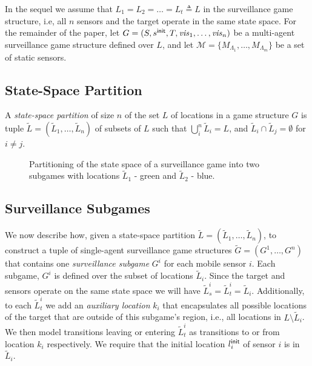 In the sequel we assume that $L_1 = L_2 = \dots = L_t \triangleq L$  in the surveillance game structure, i.e, all $n$ sensors and the target operate in the same state space. For the remainder of the paper, let $G=(S,s^{\mathsf{init}},T,\mathit{vis}_1,\ldots,\mathit{vis}_n)$ be a multi-agent surveillance game structure  defined over  $L$, and let $\mathcal M = \{M_{\Lambda_1},\dots,M_{\Lambda_m}\}$ be a set of static sensors.

\subsection{State-Space Partition}
A  \emph{state-space partition} of size $n$ of the set $L$ of locations in a game structure $G$ is tuple $\widetilde L =  (\widetilde L_1,\ldots,\widetilde L_n)$ of subsets of $L$ such that  $\bigcup_i^n \widetilde L_i = L $, and $\widetilde L_i \cap \widetilde L_j  = \emptyset$ for $i \neq j$. 


\begin{figure}
{}


\caption{Partitioning of the state space of a surveillance game into two subgames with locations $\widetilde{L}_1$ - green and $\widetilde{L}_2$ - blue. }
\label{fig:simple-dist-game}
\end{figure}

\subsection{Surveillance Subgames}
We now describe how, given a state-space partition $\widetilde L =  (\widetilde L_1,\ldots,\widetilde L_n)$, to construct a tuple of single-agent surveillance game structures $\widetilde G = (G^1,\ldots,G^n)$ that contains one  \emph{surveillance subgame} $G^i$ for each mobile sensor  $i$. Each subgame, $G^i$ is defined over the subset of locations $\widetilde{L}_i$. Since the target and sensors operate on the same state space we will have $\widetilde{L}^i_s = \widetilde{L}^i_t = \widetilde{L}_i$. Additionally, to each $\widetilde{L}^i_t$ we add an \emph{auxiliary location} $k_i$ that encapsulates all possible locations of the target that are outside of this subgame's region, i.e., all locations in $L \setminus \widetilde{L}_i$.  We then model transitions leaving or entering $\widetilde{L}^i_t$ as transitions to or from location $k_i$ respectively.
We require that the initial location $l_i^{\mathsf{init}}$ of sensor $i$ is in $\widetilde{L}_i$.

